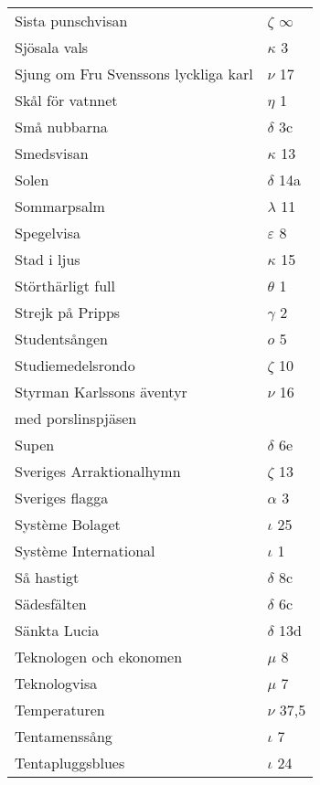 \documentclass[a6paper,10pt]{article}
\begin{document}
\newpage
\setlength{\oddsidemargin}{-0.37in}
\begin{table}[!h]
\begin{tabular}{l l}
Sista punschvisan	&$\zeta$ $\infty$\\
Sjösala vals	&$\kappa$ 3\\
Sjung om Fru Svenssons lyckliga karl&	$\nu$ 17\\
Skål för vatnnet&	$\eta$ 1\\
Små nubbarna&	$\delta$ 3c\\
Smedsvisan	&$\kappa$ 13\\
Solen	&$\delta$ 14a\\
Sommarpsalm	&$\lambda$ 11\\
Spegelvisa&	$\varepsilon$ 8\\
Stad i ljus&       $\kappa$ 15\\
Störthärligt full&	$\theta$ 1\\
Strejk på Pripps&	$\gamma$ 2\\
Studentsången&	$o$ 5\\
Studiemedelsrondo&$\zeta$ 10\\
Styrman Karlssons äventyr &$\nu$ 16\\
med porslinspjäsen	&\\
Supen	&$\delta$ 6e\\
Sveriges Arraktionalhymn	&$\zeta$ 13\\
Sveriges flagga	&$\alpha$ 3\\
Système Bolaget&	$\iota$ 25\\
Système International&	$\iota$ 1\\
Så hastigt	&$\delta$ 8c\\
Sädesfälten	&$\delta$ 6c\\
Sänkta Lucia	&$\delta$ 13d\\
Teknologen och ekonomen&$\mu$ 8\\
Teknologvisa	&$\mu$ 7\\
Temperaturen	&$\nu$ 37,5\\
Tentamenssång&	$\iota$ 7\\
Tentapluggsblues&$\iota$ 24\\
\end{tabular}
\end{table}
\end{document}

